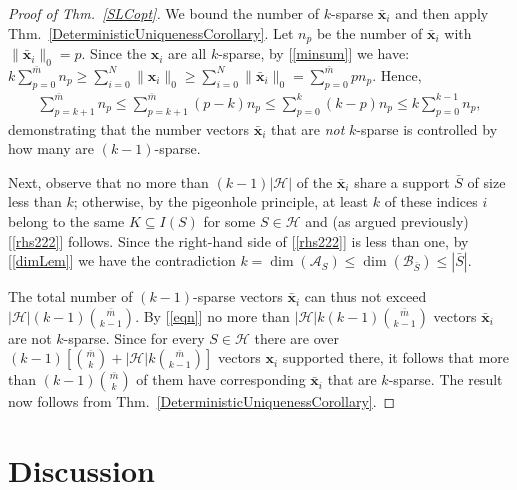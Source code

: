 \documentclass[9pt,twocolumn]{pnas-new}
\renewcommand{\eqref}[1]{\textnormal{[\ref{#1}]}}
\begin{document}
\begin{proof}[Proof of Thm.~\ref{SLCopt}]
We bound the number of $k$-sparse $\mathbf{\bar x}_i$ and then apply Thm.~\ref{DeterministicUniquenessCorollary}. 
Let $n_p$ be the number of $\mathbf{\bar x}_i$ with $\|\mathbf{\bar x}_i\|_0 = p$.
Since the $\mathbf{x}_i$ are all $k$-sparse, by \eqref{minsum} we have:
\mbox{$k \sum_{p = 0}^{\bar m} n_p \geq \sum_{i=0}^N \|\mathbf{x}_i\|_0 \geq \sum_{i=0}^N \|\mathbf{\bar x}_i\|_0 = \sum_{p=0}^{\bar m} p n_p.$}
Hence,
\begin{align}\label{eqn}
\sum_{p = k+1}^{\bar m} n_p \leq \sum_{p = k+1}^{\bar m} (p-k) n_p \leq \sum_{p = 0}^k (k-p)n_p \leq k \sum_{p = 0}^{k-1} n_p,
\end{align}
%
demonstrating that the number vectors $\mathbf{\bar x}_i$ that are \emph{not} $k$-sparse is controlled by how many are $(k-1)$-sparse. 

Next, observe that no more than $(k-1)|\mathcal{H}|$ of the $\mathbf{\bar x}_i$ share a support $\bar S$ of size less than $k$; otherwise, by the pigeonhole principle, at least $k$ of these indices $i$ belong to the same $K \subseteq I(S)$ for some $S \in \mathcal{H}$ and (as argued previously) \eqref{rhs222} follows. Since the right-hand side of \eqref{rhs222} is less than one, by \eqref{dimLem} we have the contradiction $k = \dim(\bm{\mathcal{A}}_S) \leq \dim(\bm{\mathcal{B}}_{\bar S}) \leq |\bar S|.$ 

The total number of $(k-1)$-sparse vectors $\mathbf{\bar x}_i$ can thus not exceed $|\mathcal{H}|(k-1){ \bar m \choose k-1}$. By \eqref{eqn} no more than $|\mathcal{H}|k(k-1){ \bar m \choose k-1}$ vectors $\mathbf{\bar x}_i$ are not $k$-sparse. Since for every $S \in \mathcal{H}$ there are over $(k-1)\left[ {\bar m \choose k} + |\mathcal{H}|k{ \bar m \choose k-1} \right]$ vectors $\mathbf{x}_i$ supported there, it follows that more than $(k-1){\bar m \choose k}$ of them have corresponding $\mathbf{\bar x}_i$ that are $k$-sparse. The result now follows from Thm.~\ref{DeterministicUniquenessCorollary}.
\end{proof}

\section{Discussion}\label{Discussion}

\end{document}
